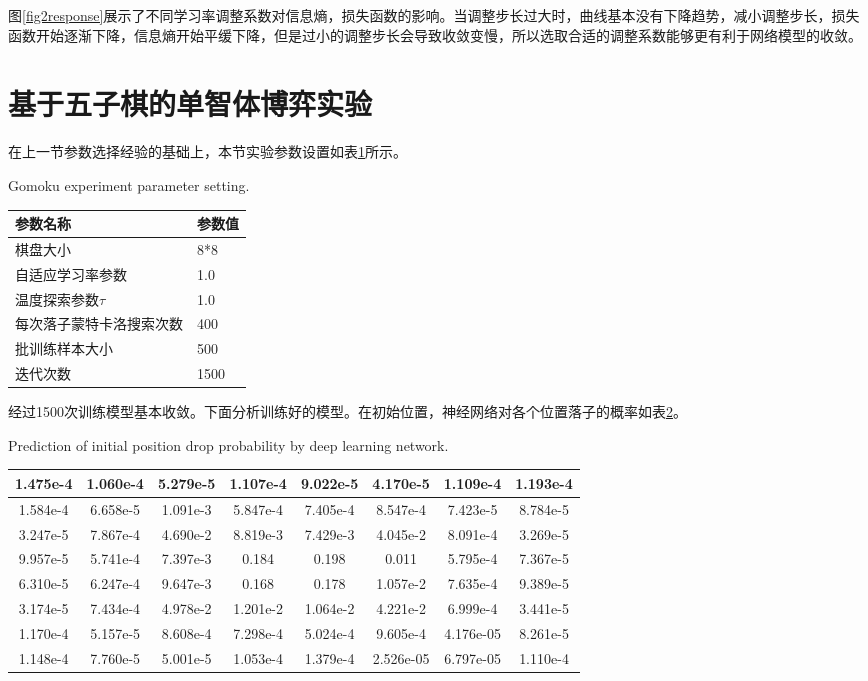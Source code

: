 图\ref{fig2response}展示了不同学习率调整系数对信息熵，损失函数的影响。当调整步长过大时，曲线基本没有下降趋势，减小调整步长，损失函数开始逐渐下降，信息熵开始平缓下降，但是过小的调整步长会导致收敛变慢，所以选取合适的调整系数能够更有利于网络模型的收敛。
\section{基于五子棋的单智体博弈实验}
在上一节参数选择经验的基础上，本节实验参数设置如表\ref{canshu}所示。

\begin{table}[htpb]
	\centering
	{Gomoku experiment parameter setting.}
	\label{canshu}
	\begin{tabular}{ll} \toprule
		参数名称   & 参数值  \\  \midrule
		棋盘大小 & 8*8 \\ 
		自适应学习率参数 & 1.0 \\ 
		温度探索参数$\tau$& 1.0 \\ 
		每次落子蒙特卡洛搜索次数 & 400 \\ 
		批训练样本大小 & 500 \\ 
		迭代次数 & 1500 \\ 
		\bottomrule
	\end{tabular}
\end{table}


经过1500次训练模型基本收敛。下面分析训练好的模型。在初始位置，神经网络对各个位置落子的概率如表\ref{tab:gailv}。
\begin{table}[htbp]
	\centering
	{Prediction of initial position drop probability by deep learning network.}
	\label{tab:gailv}
	\begin{tabular}{|c|c|c|c|c|c|c|c|}
		\hline 
		1.475e-4 & 1.060e-4 & 5.279e-5 & 1.107e-4 & 9.022e-5 & 4.170e-5 & 1.109e-4 & 1.193e-4 \\ 
		\hline 
		1.584e-4 & 6.658e-5 & 1.091e-3 & 5.847e-4 & 7.405e-4 & 8.547e-4 & 7.423e-5 & 8.784e-5 \\ 
		\hline 
		3.247e-5 & 7.867e-4& 4.690e-2 & 8.819e-3 & 7.429e-3&4.045e-2 & 8.091e-4 & 3.269e-5 \\ 
		\hline 
		9.957e-5& 5.741e-4 & 7.397e-3 & 0.184 & 0.198 & 0.011& 5.795e-4 & 7.367e-5 \\ 
		\hline 
		6.310e-5 &6.247e-4& 9.647e-3& 0.168 & 0.178 & 1.057e-2 & 7.635e-4 & 9.389e-5 \\ 
		\hline 
		3.174e-5 & 7.434e-4 & 4.978e-2 & 1.201e-2 & 1.064e-2 & 4.221e-2 & 6.999e-4 & 3.441e-5 \\ 
		\hline 
		1.170e-4 & 5.157e-5& 8.608e-4 & 7.298e-4 & 5.024e-4 & 9.605e-4 & 4.176e-05 & 8.261e-5\\ 
		\hline 
		1.148e-4 &7.760e-5 &  5.001e-5 & 1.053e-4 & 1.379e-4 & 2.526e-05 & 6.797e-05 & 1.110e-4 \\ 
		\hline 
	\end{tabular} 
\end{table}

